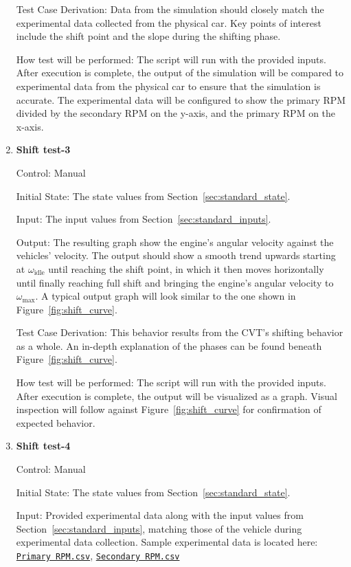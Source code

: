 \documentclass[12pt, titlepage]{article}
\newcommand{\refdata}[2]{
  \href{https://github.com/gr812b/CVT-Simulator/blob/main/experimental-data/#1
  }{\texttt{#2}}}
\begin{document}
\begin{enumerate}
  Test Case Derivation: Data from the simulation should closely match the experimental data collected from the physical car. Key points of interest include the shift point and the slope during the shifting phase.

  How test will be performed: The script will run with the provided inputs. After execution is complete, the output of the simulation will be compared to experimental data from the physical car to ensure that the simulation is accurate. The experimental data will be configured to show the primary RPM divided by the secondary RPM on the y-axis, and the primary RPM on the x-axis.
  
  \item {} \hypertarget{Shift test-3}{\textbf{Shift test-3}} \label{Shift test-3}
  
  Control: Manual
            
  Initial State: The state values from Section~\ref{sec:standard_state}.
  
  Input: The input values from Section~\ref{sec:standard_inputs}.
            
  Output: The resulting graph show the engine's angular velocity against the vehicles' velocity. The output should show a smooth trend upwards starting at $\omega_\text{idle}$ until reaching the shift point, in which it then moves horizontally until finally reaching full shift and bringing the engine's angular velocity to $\omega_\text{max}$. A typical output graph will look similar to the one shown in Figure~\ref{fig:shift_curve}.
  
  Test Case Derivation: This behavior results from the CVT's shifting behavior as a whole. An in-depth explanation of the phases can be found beneath Figure~\ref{fig:shift_curve}.
  
  How test will be performed: The script will run with the provided inputs. After execution is complete, the output will be visualized as a graph. Visual inspection will follow against Figure~\ref{fig:shift_curve} for confirmation of expected behavior.
  
  \item {} \hypertarget{Shift test-4}{\textbf{Shift test-4}} \label{Shift test-4}

  Control: Manual

  Initial State: The state values from Section~\ref{sec:standard_state}.

  Input: Provided experimental data along with the input values from Section~\ref{sec:standard_inputs}, matching those of the vehicle during experimental data collection. Sample experimental data is located here: \refdata{RPM\%20PRIM.csv}{Primary RPM.csv}, \refdata{RPM\%20SEC.csv}{Secondary RPM.csv}


\end{enumerate}
\end{document}
